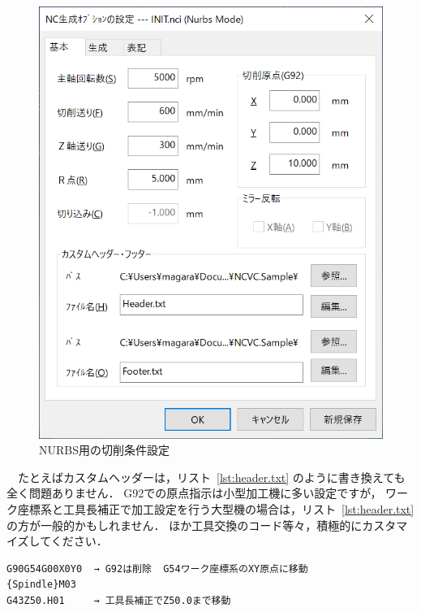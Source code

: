 \begin{minipage}{0.5\textwidth}
\begin{figure}[H]
\centering
\includegraphics[scale=0.7]{No2/fig/fig27.png}
\caption{NURBS用の切削条件設定}
\label{fig:ncvc27}
\end{figure}
\end{minipage}

\vspace*{2zh}
　たとえばカスタムヘッダーは，リスト~\ref{lst:header.txt} のように書き換えても全く問題ありません．
G92での原点指示は小型加工機に多い設定ですが，
ワーク座標系と工具長補正で加工設定を行う大型機の場合は，リスト~\ref{lst:header.txt} の方が一般的かもしれません．
ほか工具交換のコード等々，積極的にカスタマイズしてください．

\begin{lstlisting}[caption=カスタムヘッダーの例,numbers=none,label=lst:header.txt]
%
G90G54G00X0Y0  → G92は削除  G54ワーク座標系のXY原点に移動
{Spindle}M03
G43Z50.H01     → 工具長補正でZ50.0まで移動
\end{lstlisting}


